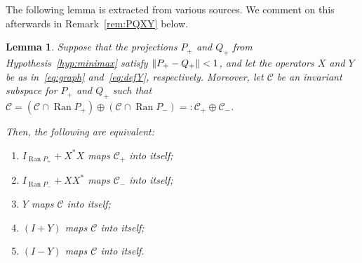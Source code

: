 \documentclass[11pt,a4paper]{amsart}
\numberwithin{equation}{section}
\DeclareMathOperator{\Ran}{Ran}
\DeclarePairedDelimiter{\norm}{\lVert}{\rVert}
\newcommand{\cC}{{\mathcal C}}
\theoremstyle{plain}
\newtheorem{lemma}[theorem]{Lemma}
\theoremstyle{definition}
\theoremstyle{remark}
\begin{document}
The following lemma is extracted from various sources. We comment on this afterwards in Remark~\ref{rem:PQXY} below.
\begin{lemma}\label{lem:PQXY}
  Suppose that the projections $P_+$ and $Q_+$ from Hypothesis~\ref{hyp:minimax} satisfy $\norm{P_+ - Q_+} < 1$, and let the
  operators $X$ and $Y$ be as in~\eqref{eq:graph} and~\eqref{eq:defY}, respectively. Moreover, let $\cC$ be an invariant subspace
  for $P_+$ and $Q_+$ such that $\cC = (\cC \cap \Ran P_+) \oplus (\cC \cap \Ran P_-) =: \cC_+ \oplus \cC_-$.
  
  Then, the following are equivalent:
  \begin{enumerate}
    \renewcommand{\theenumi}{\roman{enumi}}

    \item $I_{\Ran P_+} + X^*X$ maps $\cC_+$ into itself;

    \item $I_{\Ran P_-} + XX^*$ maps $\cC_-$ into itself;

    \item $Y$ maps $\cC$ into itself;

    \item $(I+Y)$ maps $\cC$ into itself;

    \item $(I-Y)$ maps $\cC$ into itself.

  \end{enumerate}
\end{lemma}
\end{document}
